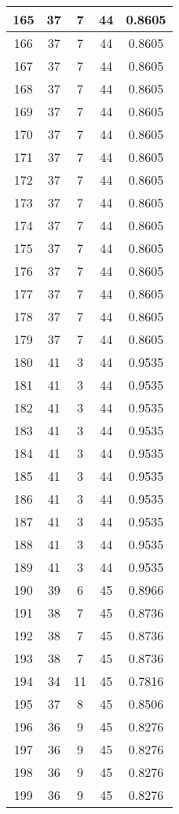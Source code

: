 \documentclass[letterpaper, 12pt]{article}
\begin{document}
\begin{longtable}{|c|c|c|c|c|}
\hline
165 & 37 & 7 & 44 & 0.8605 \\
\hline
166 & 37 & 7 & 44 & 0.8605 \\
\hline
167 & 37 & 7 & 44 & 0.8605 \\
\hline
168 & 37 & 7 & 44 & 0.8605 \\
\hline
169 & 37 & 7 & 44 & 0.8605 \\
\hline
170 & 37 & 7 & 44 & 0.8605 \\
\hline
171 & 37 & 7 & 44 & 0.8605 \\
\hline
172 & 37 & 7 & 44 & 0.8605 \\
\hline
173 & 37 & 7 & 44 & 0.8605 \\
\hline
174 & 37 & 7 & 44 & 0.8605 \\
\hline
175 & 37 & 7 & 44 & 0.8605 \\
\hline
176 & 37 & 7 & 44 & 0.8605 \\
\hline
177 & 37 & 7 & 44 & 0.8605 \\
\hline
178 & 37 & 7 & 44 & 0.8605 \\
\hline
179 & 37 & 7 & 44 & 0.8605 \\
\hline
180 & 41 & 3 & 44 & 0.9535 \\
\hline
181 & 41 & 3 & 44 & 0.9535 \\
\hline
182 & 41 & 3 & 44 & 0.9535 \\
\hline
183 & 41 & 3 & 44 & 0.9535 \\
\hline
184 & 41 & 3 & 44 & 0.9535 \\
\hline
185 & 41 & 3 & 44 & 0.9535 \\
\hline
186 & 41 & 3 & 44 & 0.9535 \\
\hline
187 & 41 & 3 & 44 & 0.9535 \\
\hline
188 & 41 & 3 & 44 & 0.9535 \\
\hline
189 & 41 & 3 & 44 & 0.9535 \\
\hline
190 & 39 & 6 & 45 & 0.8966 \\
\hline
191 & 38 & 7 & 45 & 0.8736 \\
\hline
192 & 38 & 7 & 45 & 0.8736 \\
\hline
193 & 38 & 7 & 45 & 0.8736 \\
\hline
194 & 34 & 11 & 45 & 0.7816 \\
\hline
195 & 37 & 8 & 45 & 0.8506 \\
\hline
196 & 36 & 9 & 45 & 0.8276 \\
\hline
197 & 36 & 9 & 45 & 0.8276 \\
\hline
198 & 36 & 9 & 45 & 0.8276 \\
\hline
199 & 36 & 9 & 45 & 0.8276 \\
\hline
\end{longtable}
\end{document}
